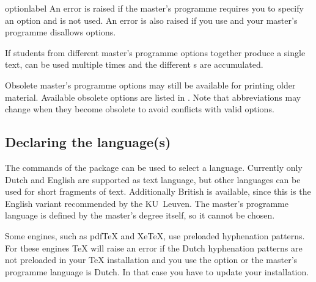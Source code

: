 \begin{labelled}{optionlabel}
  An error is raised if the master's programme requires you to specify an
  option and  is not used. An error is also raised
  if you use  and your master's programme disallows options.

  If students from different master's programme options together produce a
  single text,  can be used multiple times and the different
  s are accumulated.

  Obsolete master's programme options may still be available for printing older
  material. Available obsolete options are listed in . Note
  that abbreviations may change when they become obsolete to avoid conflicts
  with valid options.
\end{labelled}

\subsection{Declaring the language(s)}
The commands of the  package can be used to select a language.
Currently only Dutch and English are supported as text language, but other
languages can be used for short fragments of text.
Additionally British is available, since this is the English variant
recommended by the KU~Leuven. The master's programme language is defined by the
master's degree itself, so it cannot be chosen.

Some engines, such as pdfTeX and XeTeX, use preloaded hyphenation patterns. For
these engines TeX will raise an error if the Dutch hyphenation patterns are not
preloaded in your TeX installation and you use the option  or the
master's programme language is Dutch. In that case you have to update your
installation.

